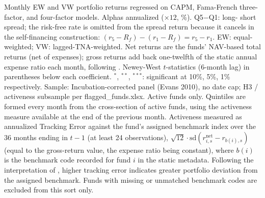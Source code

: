 \begin{table}[!htbp]
\begin{minipage}{\tabletempwidth}
\ifdim\wd\tabletempbox>\linewidth
  \resizebox{\linewidth}{!}{\usebox{\tabletempbox}}
\else
  \usebox{\tabletempbox}
\fi
\par\medskip
\begin{singlespace}\tablefont\noindent
Monthly EW and VW portfolio returns regressed on CAPM, Fama-French three-factor, and \textcite{Carhart1997} four-factor models. Alphas annualized ($\times 12$, \%). Q5$-$Q1: long- short spread; the risk-free rate is omitted from the spread return because it cancels in the self-financing construction: $(r_5 - R_f) - (r_1 - R_f) = r_5 - r_1$. EW: equal-weighted; VW: lagged-TNA-weighted. Net returns are the funds' NAV-based total returns (net of expenses); gross returns add back one-twelfth of the static annual expense ratio each month, following \textcite{FamaFrench2010}. Newey-West $t$-statistics (6-month lag) in parentheses below each coefficient. $^{*}$, $^{**}$, $^{***}$: significant at 10\%, 5\%, 1\% respectively. Sample: Incubation-corrected panel (Evans 2010), no date cap; H3 / activeness subsample per flagged\_funds.xlsx. Active funds only. Quintiles are formed every month from the cross-section of active funds, using the activeness measure available at the end of the previous month. Activeness measured as annualized Tracking Error against the fund's assigned benchmark index over the 36 months ending in $t-1$ (at least 24 observations), $\sqrt{12}\cdot\mathrm{sd}(r_{i,s}^{\text{net}}-r_{b(i),s})$ (equal to the gross-return value, the expense ratio being constant), where $b(i)$ is the benchmark code recorded for fund $i$ in the static metadata. Following the interpretation of \textcite{CremersPetajisto2009}, higher tracking error indicates greater portfolio deviation from the assigned benchmark. Funds with missing or unmatched benchmark codes are excluded from this sort only.
\end{singlespace}
\end{minipage}
\end{table}

